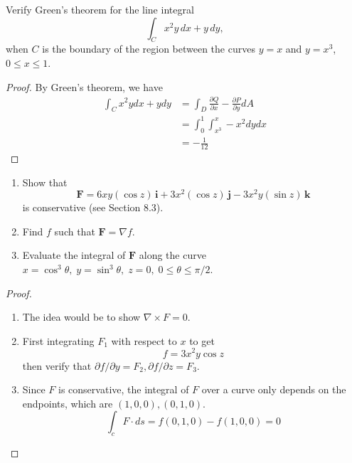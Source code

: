 \documentclass[openany]{book}
\begin{document}
\begin{prob}[4]
    Verify Green's theorem for the line integral
    \[
    \int_C x^2 y \, dx + y \, dy,
    \]
    when \( C \) is the boundary of the region between the curves \( y = x \) and \( y = x^3 \), \( 0 \leq x \leq 1 \).
\end{prob}
\begin{proof}
    By Green's theorem, we have 
    \begin{align*}
        \int_Cx^2ydx+ydy&=\int_D\frac{\partial Q}{\partial x}-\frac{\partial P}{\partial y}dA\\
        &=\int_0^1\int_{x^3}^x-x^2dydx\\
        &=-\frac{1}{12}
    \end{align*}
\end{proof}

\begin{prob}[7]
    \begin{enumerate}
        \item[(a)] Show that  
        \[
        \mathbf{F} = 6xy(\cos z) \, \mathbf{i} + 3x^2(\cos z) \, \mathbf{j} - 3x^2 y(\sin z) \, \mathbf{k}
        \]
        is conservative (see Section 8.3). 
        \item[(b)] Find \( f \) such that \( \mathbf{F} = \nabla f \).  
        \item[(c)] Evaluate the integral of \( \mathbf{F} \) along the curve \( x = \cos^3 \theta, \; y = \sin^3 \theta, \; z = 0, \; 0 \leq \theta \leq \pi/2 \).
    \end{enumerate}
\end{prob}
\begin{proof}
    \begin{enumerate}
        \item[(a)] The idea would be to show $\nabla\times F=0$.
        \item[(b)] First integrating $F_1$ with respect to $x$ to get
        \begin{equation*}
            f=3x^2y\cos z
        \end{equation*}
        then verify that $\partial f/\partial y=F_2, \partial f/\partial z=F_3$.
        \item[(c)] Since $F$ is conservative, the integral of $F$ over a curve only depends on the endpoints, which are $(1,0,0), (0,1,0)$.
        \begin{equation*}
            \int_cF\cdot ds=f(0,1,0)-f(1,0,0)=0
        \end{equation*}
    \end{enumerate}
\end{proof}
\end{document}
